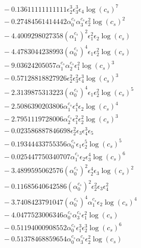 \documentclass[10pt]{article}
\begin{document}
\begin{align*}
&{}  - 0.13611111111111 \epsilon_{2}^{3} \epsilon_{3}^{3} \epsilon_{4} \log{\left(c_{s} \right)}^{7} \\
&{}  - 0.27484561414442 \alpha_{0}^{c_s} \alpha_{3}^{c_s} \epsilon_{2}^{2} \log{\left(c_{s} \right)}^{2} \\
&{}  - 4.4009298027358 \left(\alpha_{1}^{c_s}\right)^{2} \epsilon_{1}^{2} \epsilon_{2} \log{\left(c_{s} \right)} \\
&{}  - 4.4783044238993 \left(\alpha_{0}^{c_s}\right)^{4} \epsilon_{1} \epsilon_{2}^{2} \log{\left(c_{s} \right)} \\
&{}  - 9.03624205057 \alpha_{1}^{c_s} \alpha_{2}^{c_s} \epsilon_{1}^{2} \log{\left(c_{s} \right)}^{3} \\
&{}  - 0.57128818827926 \epsilon_{2}^{2} \epsilon_{3}^{2} \epsilon_{4}^{3} \log{\left(c_{s} \right)}^{3} \\
&{}  - 2.3139875313223 \left(\alpha_{0}^{c_s}\right)^{4} \epsilon_{1} \epsilon_{2}^{2} \log{\left(c_{s} \right)}^{5} \\
&{}  - 2.5086390203806 \alpha_{1}^{c_s} \epsilon_{1}^{4} \epsilon_{2} \log{\left(c_{s} \right)}^{4} \\
&{}  - 2.7951119728006 \alpha_{2}^{c_s} \epsilon_{1}^{2} \epsilon_{2}^{2} \log{\left(c_{s} \right)}^{3} \\
&{}  - 0.023586887846698 \epsilon_{2}^{2} \epsilon_{3} \epsilon_{4}^{3} \epsilon_{5} \\
&{}  - 0.19344433755356 \alpha_{0}^{c_s} \epsilon_{1} \epsilon_{2}^{5} \log{\left(c_{s} \right)}^{5} \\
&{}  - 0.025447750340707 \alpha_{1}^{c_s} \epsilon_{2} \epsilon_{3}^{4} \log{\left(c_{s} \right)}^{6} \\
&{}  - 3.4899595062576 \left(\alpha_{0}^{c_s}\right)^{2} \epsilon_{2}^{4} \epsilon_{3} \log{\left(c_{s} \right)}^{2} \\
&{}  - 0.11685640642586 \left(\alpha_{0}^{c_s}\right)^{2} \epsilon_{2}^{2} \epsilon_{3} \epsilon_{4}^{2} \\
&{}  - 3.7408423791047 \left(\alpha_{0}^{c_s}\right)^{4} \alpha_{1}^{c_s} \epsilon_{2} \log{\left(c_{s} \right)}^{4} \\
&{}  - 4.0477523006346 \alpha_{0}^{c_s} \alpha_{3}^{c_s} \epsilon_{1}^{2} \log{\left(c_{s} \right)} \\
&{}  - 0.51194000908552 \alpha_{0}^{c_s} \epsilon_{1}^{3} \epsilon_{2}^{3} \log{\left(c_{s} \right)}^{6} \\
&{}  - 0.51378468859654 \alpha_{0}^{c_s} \alpha_{3}^{c_s} \epsilon_{2}^{2} \log{\left(c_{s} \right)} \\

\end{align*}
\end{document}
